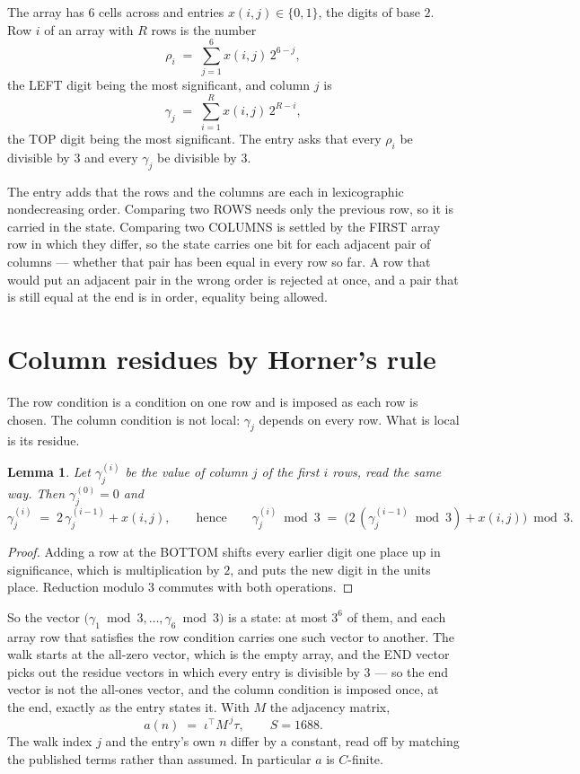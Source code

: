 \documentclass[11pt,a4paper]{article}
\theoremstyle{plain}
\newtheorem{lemma}[theorem]{Lemma}
\theoremstyle{definition}
\begin{document}
The array has $6$ cells across and entries $x(i,j)\in\{0,1\}$, the digits of
base $2$. Row $i$ of an array with $R$ rows is the number
\[
\rho_i\;=\;\sum_{j=1}^{6}x(i,j)\,2^{6-j} ,
\]
the LEFT digit being the most significant, and column $j$ is
\[
\gamma_j\;=\;\sum_{i=1}^{R}x(i,j)\,2^{R-i} ,
\]
the TOP digit being the most significant. The entry asks that every $\rho_i$ be divisible by
$3$ and every $\gamma_j$ be divisible by $3$.

The entry adds that the rows and the columns are each in lexicographic nondecreasing order. Comparing
two ROWS needs only the previous row, so it is carried in the state. Comparing two COLUMNS is
settled by the FIRST array row in which they differ, so the state carries one bit for each
adjacent pair of columns --- whether that pair has been equal in every row so far. A row that
would put an adjacent pair in the wrong order is rejected at once, and a pair that is still
equal at the end is in order, equality being allowed.

\section{Column residues by Horner's rule}

The row condition is a condition on one row and is imposed as each row is chosen. The column
condition is not local: $\gamma_j$ depends on every row. What is local is its residue.

\begin{lemma}\label{lem:horner}
Let $\gamma_j^{(i)}$ be the value of column $j$ of the first $i$ rows, read the same way.
Then $\gamma_j^{(0)}=0$ and
\[
\gamma_j^{(i)}\;=\;2\,\gamma_j^{(i-1)}+x(i,j),
\qquad\text{hence}\qquad
\gamma_j^{(i)}\bmod 3\;=\;
\bigl(2\,(\gamma_j^{(i-1)}\bmod 3)+x(i,j)\bigr)\bmod 3 .
\]
\end{lemma}

\begin{proof}
Adding a row at the BOTTOM shifts every earlier digit one place up in significance, which is
multiplication by $2$, and puts the new digit in the units place. Reduction modulo
$3$ commutes with both operations.
\end{proof}

So the vector $\bigl(\gamma_1\bmod 3,\dots,\gamma_{6}\bmod
3\bigr)$ is a state: at most $3^{6}$ of them, and each array row
that satisfies the row condition carries one such vector to another. The walk starts at the
all-zero vector, which is the empty array, and the END vector picks out the residue vectors in
which every entry is divisible by $3$ --- so the end vector is not the all-ones
vector, and the column condition is imposed once, at the end, exactly as the entry states it.
With $M$ the adjacency matrix,
\[
a(n)\;=\;\iota^{\!\top}M^{\,j}\tau ,\qquad S=1688.
\]
The walk index $j$ and the entry's own $n$ differ by a constant, read off by matching the
published terms rather than assumed. In particular $a$ is $C$-finite.
\end{document}
